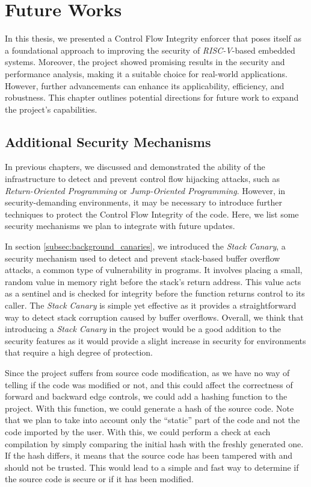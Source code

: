 \chapter{Future Works}
\label{cha:future}

In this thesis, we presented a Control Flow Integrity enforcer that poses itself
as a foundational approach to improving the security of \textit{RISC-V}-based
embedded systems. Moreover, the project showed promising results in the security
and performance analysis, making it a suitable choice for real-world applications.
However, further advancements can enhance its applicability, efficiency, and robustness.
This chapter outlines potential directions for future work to expand the project's
capabilities.

\section{Additional Security Mechanisms}
\label{sec:future_security}

In previous chapters, we discussed and demonstrated the ability of the
infrastructure to detect and prevent control flow hijacking attacks, such as \textit{Return-Oriented
Programming} or \textit{Jump-Oriented Programming}. However, in security-demanding
environments, it may be necessary to introduce further techniques to protect the
Control Flow Integrity of the code. Here, we list some security mechanisms we
plan to integrate with future updates.

In section \ref{subsec:background_canaries}, we introduced the \textit{Stack
Canary}, a security mechanism used to detect and prevent stack-based buffer overflow
attacks, a common type of vulnerability in programs. It involves placing a small,
random value in memory right before the stack's return address. This value acts as
a sentinel and is checked for integrity before the function returns control to its
caller. The \textit{Stack Canary} is simple yet effective as it provides a straightforward
way to detect stack corruption caused by buffer overflows. Overall, we think that
introducing a \textit{Stack Canary} in the project would be a good addition to
the security features as it would provide a slight increase in security for
environments that require a high degree of protection.

Since the project suffers from source code modification, as we have no way of telling
if the code was modified or not, and this could affect the correctness of
forward and backward edge controls, we could add a hashing function to the project.
With this function, we could generate a hash of the source code. Note that we
plan to take into account only the ``static'' part of the code and not the code
imported by the user. With this, we could perform a check at each compilation by
simply comparing the initial hash with the freshly generated one. If the hash differs,
it means that the source code has been tampered with and should not be trusted. This
would lead to a simple and fast way to determine if the source code is secure or
if it has been modified.

